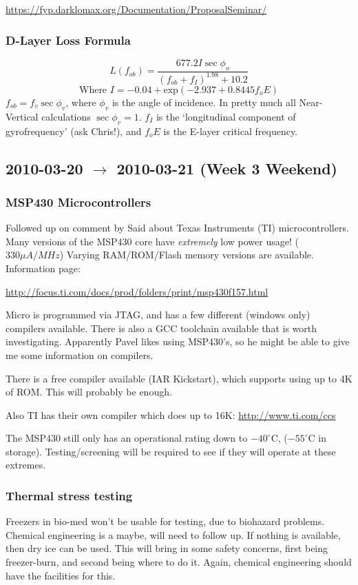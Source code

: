 \documentclass[a4paper,10pt]{article}
\begin{document}
\url{https://fyp.darklomax.org/Documentation/ProposalSeminar/}

\subsubsection{D-Layer Loss Formula}
\[ L(f_{ob}) = \frac{677.2 I \sec{\phi_o}}{(f_{ob} + f_I)^{1.98} + 10.2}\]
\[ \mbox{Where } I = -0.04 + \mbox{exp}(-2.937 + 0.8445 f_oE) \]
$f_{ob} = f_v \sec{\phi_v}$, where $\phi_v$ is the angle of incidence. In pretty much all Near-Vertical calculations $\sec{\phi_v} = 1$. $f_I$ is the `longitudinal component of gyrofrequency' (ask Chris!), and $f_oE$ is the E-layer critical frequency.

\subsection{2010-03-20 $\to$ 2010-03-21 (Week 3 Weekend)}
\subsubsection{MSP430 Microcontrollers}
Followed up on comment by Said about Texas Instruments (TI) microcontrollers. Many versions of the MSP430 core have \textit{extremely} low power usage! ($330\mu A/MHz$) Varying RAM/ROM/Flash memory versions are available. Information page: 

\url{http://focus.ti.com/docs/prod/folders/print/msp430f157.html}

Micro is programmed via JTAG, and has a few different (windows only) compilers available. There is also a GCC toolchain available that is worth investigating. Apparently Pavel likes using MSP430's, so he might be able to give me some information on compilers.

There is a free compiler available (IAR Kickstart), which supports using up to 4K of ROM. This will probably be enough.

Also TI has their own compiler which does up to 16K:
\url{http://www.ti.com/ccs}

The MSP430 still only has an operational rating down to $-40^\circ$C, ($-55^\circ$C in storage). Testing/screening will be required to see if they will operate at these extremes.


\subsubsection{Thermal stress testing}
Freezers in bio-med won't be usable for testing, due to biohazard problems. Chemical engineering is a maybe, will need to follow up. If nothing is available, then dry ice can be used. This will bring in some safety concerns, first being freezer-burn, and second being where to do it. Again, chemical engineering should have the facilities for this.
\end{document}

